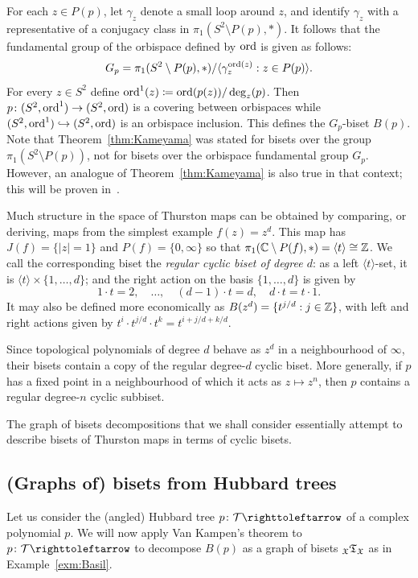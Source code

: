\documentclass{amsart}
\begin{document}
For each $z\in P(p)$, let $\gamma_z$ denote a small loop around $z$, and
identify $\gamma_z$ with a representative of a conjugacy class in
$\pi_1( S^2\setminus P(p),*)$. It follows that the fundamental group of the
orbispace defined by $\operatorname{ord}$ is given as follows:
\begin{equation}
\label{eq:G_p}
G_p = \pi_1( S^2\setminus P(p),*)/\langle \gamma_z^{\operatorname{ord}(z)}:z\in P(p)\rangle.
\end{equation}
For every $z\in S^2$ define $\operatorname{ord}^1(z)\coloneqq \operatorname{ord}(p(z))/\deg_z(p)$. Then
$p\colon (S^2,\operatorname{ord}^1)\to (S^2,\operatorname{ord})$ is a covering between orbispaces while
$(S^2,\operatorname{ord}^1)\hookrightarrow (S^2,\operatorname{ord})$ is an orbispace inclusion. This
defines the $G_p$-biset $B(p)$. Note that Theorem~\ref{thm:Kameyama} was
stated for bisets over the group $\pi_1(S^2\setminus P(p))$, not for bisets
over the orbispace fundamental group $G_p$. However, an analogue of
Theorem~\ref{thm:Kameyama} is also true in that context; this will be
proven in~\cite{bartholdi-dudko:bc2}.

Much structure in the space of Thurston maps can be obtained by comparing,
or deriving, maps from the simplest example $f(z)=z^d$. This map has
$J(f)=\{|z|=1\}$ and $P(f)=\{0,\infty\}$ so that $\pi_1({\mathbb C}\setminus
P(f),*)=\langle t\rangle\cong{\mathbb Z}$. We call the corresponding biset the
\emph{regular cyclic biset of degree $d$}: as a left $\langle t\rangle$-set, it is
$\langle t\rangle\times\{1,\dots,d\}$; and the right action on the basis
$\{1,\dots,d\}$ is given by
\[1\cdot t=2,\quad\dots,\quad(d-1)\cdot t=d,\quad d\cdot t=t\cdot 1.\] It
may also be defined more economically as $B(z^d)=\{t^{j/d}:j\in{\mathbb Z}\}$, with
left and right actions given by $t^i\cdot t^{j/d}\cdot t^k=t^{i+j/d+k/d}$.

Since topological polynomials of degree $d$ behave as $z^d$ in a
neighbourhood of $\infty$, their bisets contain a copy of the
regular degree-$d$ cyclic biset. More generally, if $p$ has a fixed point in a
neighbourhood of which it acts as $z\mapsto z^n$, then $p$ contains a
regular degree-$n$ cyclic subbiset.

The graph of bisets decompositions that we shall consider essentially
attempt to describe bisets of Thurston maps in terms of cyclic bisets.

\subsection{(Graphs of) bisets from Hubbard trees}\label{ss:hubbardtrees}
Let us consider the (angled) Hubbard tree $p\colon \HT\righttoleftarrow$ of
a complex polynomial $p$. We will now apply Van Kampen's theorem to
$p\colon \HT\righttoleftarrow$ to decompose $B(p)$ as a graph of bisets
${}_{\mathfrak X}\mathfrak T_{\mathfrak X}$ as in Example~\ref{exm:Basil}.
\end{document}

